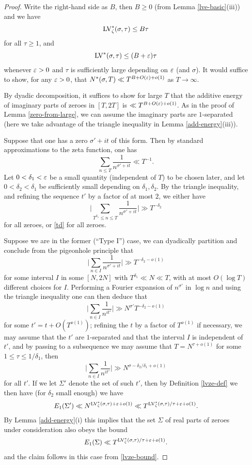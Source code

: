 \begin{proof}
Write the right-hand side as $B$, then $B \geq 0$ (from Lemma \ref{lve-basic}(iii)) and we have
\begin{equation}\label{lvze-bound}
    \mathrm{LV}^*_\zeta(\sigma,\tau) \leq B \tau
\end{equation}
for all $\tau \geq 1$, and
\begin{equation}\label{lve-bound}
    \mathrm{LV}^*(\sigma,\tau) \leq (B+\varepsilon) \tau
\end{equation}
whenever $\varepsilon>0$ and $\tau$ is sufficiently large depending on $\varepsilon$ (and $\sigma$).  It would suffice to show, for any $\varepsilon>0$, that $N^*(\sigma,T) \ll T^{B+O(\varepsilon)+o(1)}$ as $T \to \infty$.

By dyadic decomposition, it suffices to show for large $T$ that the additive energy of imaginary parts of zeroes in $[T,2T]$ is $\ll T^{B+O(\varepsilon)+o(1)}$.  As in the proof of Lemma \ref{zero-from-large}, we can assume the imaginary parts are $1$-separated (here we take advantage of the triangle inequality in Lemma \ref{add-energy}(iii)).

Suppose that one has a zero $\sigma'+i t$ of this form.  Then by standard approximations to the zeta function, one has
$$ \sum_{n \leq T} \frac{1}{n^{\sigma'+it}} \ll T^{-1}.$$
Let $0 < \delta_1 < \varepsilon$ be a small quantity (independent of $T$) to be chosen later, and let $0 < \delta_2 < \delta_1$ be sufficiently small depending on $\delta_1,\delta_2$.  By the triangle inequality, and refining the sequence $t'$ by a factor of at most $2$, we either have
$$ \bigg|\sum_{T^{\delta_1} \leq n \leq T} \frac{1}{n^{\sigma'+it}} \bigg| \gg T^{-\delta_2}$$
for all zeroes, or \eqref{td}
for all zeroes.

Suppose we are in the former (``Type I'') case, we can dyadically partition and conclude from the pigeonhole principle that
$$ \bigg| \sum_{n \in I} \frac{1}{n^{\sigma'+it}} \bigg| \gg T^{-\delta_2-o(1)}$$
for some interval $I$ in some $[N,2N]$ with $T^{\delta_1} \ll N \ll T$, with at most $O(\log T)$ different choices for $I$.  Performing a Fourier expansion of $n^{\sigma'}$ in $\log n$ and using the triangle inequality one can then deduce that
$$ \bigg| \sum_{n \in I} \frac{1}{n^{it'}} \bigg| \gg N^{\sigma'} T^{-\delta_2-o(1)}$$
for some $t' = t + O(T^{o(1)})$; refining the $t$ by a factor of $T^{o(1)}$ if necessary, we may assume that the $t'$ are $1$-separated and that the interval $I$ is independent of $t'$, and by passing to a subsequence we may assume that $T = N^{\tau+o(1)}$ for some $1 \leq \tau \leq 1/\delta_1$, then
$$ \bigg| \sum_{n \in I} \frac{1}{n^{it'}} \bigg| \gg N^{\sigma-\delta_2/\delta_1+o(1)}$$
for all $t'$.  If we let $\Sigma'$ denote the set of such $t'$, then by Definition \ref{lvze-def} we then have (for $\delta_2$ small enough) we have
$$ E_1(\Sigma') \ll N^{\mathrm{LV}^*_\zeta(\sigma,\tau) + \varepsilon + o(1)} \ll T^{\mathrm{LV}^*_\zeta(\sigma,\tau)/\tau + \varepsilon + o(1)}.$$
By Lemma \ref{add-energy}(i) this implies that the set $\Sigma$ of real parts of zeroes under consideration also obeys the bound
$$ E_1(\Sigma) \ll T^{\mathrm{LV}^*_\zeta(\sigma,\tau)/\tau + \varepsilon + o(1)}.$$
and the claim follows in this case from \eqref{lvze-bound}.


\end{proof}
